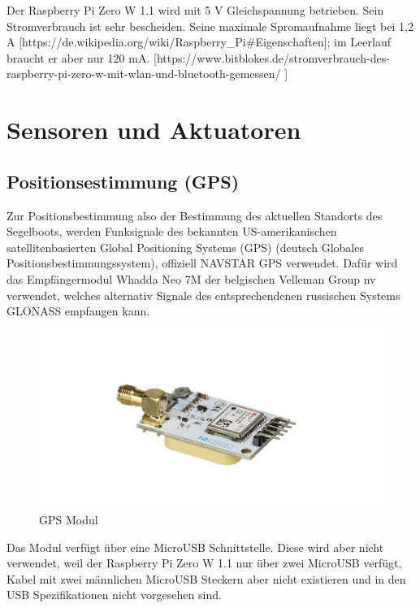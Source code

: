 Der Raspberry Pi Zero W 1.1 wird mit 5 V Gleichspannung betrieben. Sein Stromverbrauch ist sehr bescheiden. Seine maximale Spromaufnahme liegt bei 1,2 A [https://de.wikipedia.org/wiki/Raspberry_Pi#Eigenschaften]; im Leerlauf braucht er aber nur 120 mA.
[https://www.bitblokes.de/stromverbrauch-des-raspberry-pi-zero-w-mit-wlan-und-bluetooth-gemessen/ ]
\section{Sensoren und Aktuatoren}
\subsection{Positionsestimmung (GPS)}

Zur Positionsbestimmung also der Bestimmung des aktuellen Standorts des Segelboots, werden Funksignale des bekannten US-amerikanischen satellitenbasierten Global Positioning Systems (GPS) (deutsch Globales Positionsbestimmungssystem), offiziell NAVSTAR GPS verwendet. Dafür wird das Empfängermodul Whadda Neo 7M der belgischen Velleman Group nv verwendet, welches alternativ Signale des entsprechendenen russischen Systems GLONASS empfangen kann. 
\begin{figure}[H] 
    \centering
    \includegraphics[width=1\linewidth]{gps.png}
    \caption{GPS Modul}
    \label{fig:gps}
\end{figure}
Das Modul verfügt über eine MicroUSB Schnittstelle. Diese wird aber nicht verwendet, weil der Raspberry Pi Zero W 1.1 nur über zwei MicroUSB verfügt, Kabel mit zwei männlichen MicroUSB Steckern aber nicht existieren und in den USB Spezifikationen nicht vorgesehen sind. 

